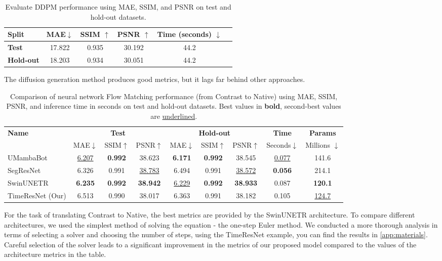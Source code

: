 \documentclass{article}
\begin{document}
\begin{table}[h!]
\centering

\label{tab:ddpm}
\begin{tabular}{lccccc}
\toprule
\textbf{Split} & MAE$\downarrow$ & SSIM $\uparrow$ & PSNR $\uparrow$ & Time (seconds) $\downarrow$\\
\midrule
\textbf{Test}        & 17.822 & 0.935 & 30.192 & 44.2 \\
\textbf{Hold‑out}    & 18.203 & 0.934 & 30.051  & 44.2\\
\bottomrule
\end{tabular}
\vspace{0.2cm}
\caption{Evaluate DDPM performance using MAE, SSIM, and PSNR on test and hold-out datasets.}
\end{table}
The diffusion generation method produces good metrics, but it lags far behind other approaches.


\begin{table}[h!]
\centering
\begin{tabular}{lcccccccc}
\toprule
\textbf{Name} 
  & \multicolumn{3}{c}{\textbf{Test}} 
  & \multicolumn{3}{c}{\textbf{Hold-out}} 
  & \textbf{Time} & \textbf{Params} \\
\cmidrule(lr){2-4} \cmidrule(lr){5-7}
  & MAE$\downarrow$ & SSIM$\uparrow$ & PSNR$\uparrow$  
  & MAE$\downarrow$ & SSIM$\uparrow$ & PSNR$\uparrow$ 
  & Seconds$\downarrow$ & Millions $\downarrow$ \\
\midrule
UMambaBot         & \underline{6.207} & \textbf{0.992} & 38.623 
                  & \textbf{6.171} & \textbf{0.992} & 38.545 & \underline{0.077} & 141.6 \\
SegResNet         & 6.326 & 0.991 & \underline{38.783} 
                  & 6.494 & 0.991 & \underline{38.572} & \textbf{0.056} & 214.1 \\
SwinUNETR         & \textbf{6.235} & \textbf{0.992} & \textbf{38.942} 
                  & \underline{6.229} & \textbf{0.992} & \textbf{38.933} & 0.087 & \textbf{120.1} \\
TimeResNet (Our)   & 6.513 & 0.990 & 38.017 
                  & 6.363 & 0.991 & 38.182 & 0.105 & \underline{124.7} \\
\bottomrule
\end{tabular}
\vspace{0.2cm}
\caption{Comparison of neural network Flow Matching performance (from Contrast to Native) using MAE, SSIM, PSNR, and inference time in seconds on test and hold-out datasets. Best values in \textbf{bold}, second-best values are \underline{underlined}.}
\label{tab:metrics_comparison_contrast}
\end{table}
For the task of translating Contrast to Native, the best metrics are provided by the SwinUNETR architecture. To compare different architectures, we used the simplest method of solving the equation - the one-step Euler method. We conducted a more thorough analysis in terms of selecting a solver and choosing the number of steps, using the TimeResNet example, you can find the results in \ref{app:materials}. Careful selection of the solver leads to a significant improvement in the metrics of our proposed model compared to the values of the architecture metrics in the table.
\end{document}
